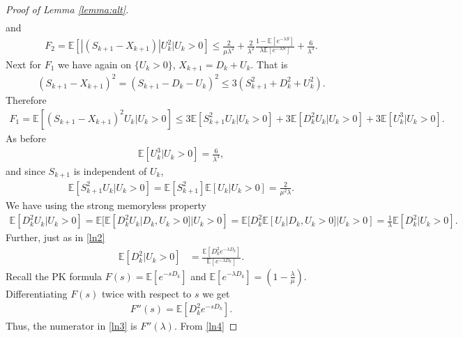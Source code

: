 \documentclass[11pt,letterpaper,reqno]{article}
\theoremstyle{thmstyleone}%
\theoremstyle{thmstyletwo}%
\theoremstyle{thmstylethree}%
\numberwithin{equation}{section}
\begin{document}
\begin{proof}[Proof of Lemma \ref{lemma:alt}]
\begin{align}
\end{align}
and 
\begin{align}\label{lnD2}
   F_2= \mathbb E[|(S_{k+1}-X_{k+1})|U_k^2|U_k>0] \leq \frac{2}{\mu \lambda^2}+\frac{2}{\lambda^2}\frac{1-\mathbb E[e^{-\lambda S}]}{\lambda\mathbb E[e^{-\lambda S}]}+\frac{6}{\lambda^3}.
\end{align}
Next for $F_1$ we have again on $\{U_k >0\}$, $X_{k+1}=D_k+U_k$. That is
\begin{align*}
(S_{k+1}-X_{k+1})^2 = (S_{k+1}-D_k-U_k)^2 \leq 3(S_{k+1}^2+D_k^2+U_k^2).
\end{align*}
Therefore
\begin{align}\label{ln13}
F_1=\mathbb E[(S_{k+1}-X_{k+1})^2U_k|U_k>0] \leq 3\mathbb E[S_{k+1}^2U_k|U_k>0] + 3\mathbb E[D_{k}^2U_k|U_k>0]+ 3\mathbb E[U_k^3|U_k>0].
\end{align}
As before
\begin{align}\label{ln14}
\mathbb E[U_k^3|U_k>0] = \frac{6}{\lambda^3},
\end{align}
and since $S_{k+1}$ is independent of $U_k$,
\begin{align}\label{ln15}
\mathbb E[S_{k+1}^2U_k|U_k>0]=\mathbb E[S_{k+1}^2]\mathbb E[U_k|U_k>0]=\frac{2}{\mu^2\lambda}.
\end{align}
We have using the strong memoryless property 
\begin{align}\label{ln6}
     \mathbb E[D_{k}^2U_k|U_k>0]=\mathbb E[ \mathbb E[D_{k}^2U_k|D_k,U_k>0]|U_k>0]=\mathbb E[ D_{k}^2\mathbb E[U_k|D_k,U_k>0]|U_k>0]=\frac{1}{\lambda}\mathbb E[D_{k}^2|U_k>0].
\end{align}
Further, just as in \eqref{ln2}
\begin{align}\label{ln3}
\mathbb E[D_{k}^2|U_k>0] &= \frac{\mathbb E[D_k^2 e^{-\lambda D_k}]}{\mathbb E[e^{-\lambda D_k}]}.
\end{align}
Recall the PK formula $F(s) = \mathbb E[e^{- s D_k}]$ and $ \mathbb E[e^{-\lambda D_k}]=\left(1-\frac{\lambda}{\mu}\right)$. Differentiating $F(s)$ twice with respect to $s$ we get
\begin{align*}
F''(s) = \mathbb E[D_k^2 e^{-s D_k}].
\end{align*}
Thus, the numerator in \eqref{ln3} is $F''(\lambda)$.
From \eqref{ln4}

\end{proof}
\end{document}
